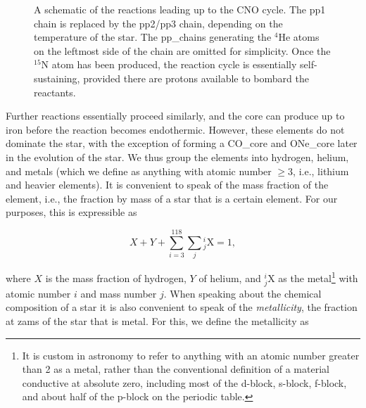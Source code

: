 \begin{figure}[!htbp]
    \caption[A schematic of the reactions leading up to the CNO cycle.]{A schematic of the reactions leading up to the CNO cycle. The \gls{pp1} chain is replaced by the \gls{pp2}/\gls{pp3} chain, depending on the temperature of the star. The \glspl{pp_chain} generating the $^4$He atoms on the leftmost side of the chain are omitted for simplicity. Once the $^{15}$N atom has been produced, the reaction cycle is essentially self-sustaining, provided there are protons available to bombard the reactants.}
    \label{fig:cno_cycle_schematic}
\end{figure}

Further reactions essentially proceed similarly, and the core can produce up to iron before the reaction becomes endothermic. However, these elements do not dominate the star, with the exception of forming a \gls{CO_core} and \gls{ONe_core} later in the evolution of the star. We thus group the elements into hydrogen, helium, and metals (which we define as anything with atomic number $\geq3$, i.e., lithium and heavier elements). It is convenient to speak of the mass fraction of the element, i.e., the fraction by mass of a star that is a certain element. For our purposes, this is expressible as

\begin{equation}
	X+Y+\sum_{i=3}^{118} \sum_{j} {}^{i}_{j}\text{X} = 1, \label{eq:mass_fracs}
\end{equation}

where $X$ is the mass fraction of hydrogen, $Y$ of helium, and ${}^{i}_{j}\text{X}$ as the metal\footnote{It is custom in astronomy to refer to anything with an atomic number greater than 2 as a metal, rather than the conventional definition of a material conductive at absolute zero, including most of the d-block, s-block, f-block, and about half of the p-block on the periodic table.} with atomic number $i$ and mass number $j$. When speaking about the chemical composition of a star it is also convenient to speak of the \textit{metallicity}, the fraction at \gls{zams} of the star that is metal. For this, we define the metallicity as

